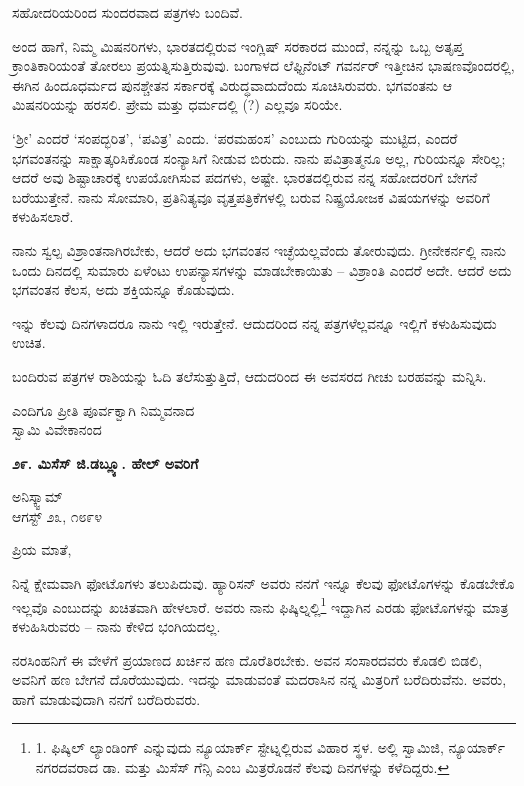 ಸಹೋದರಿಯರಿಂದ ಸುಂದರವಾದ ಪತ್ರಗಳು ಬಂದಿವೆ.

ಅಂದ ಹಾಗೆ, ನಿಮ್ಮ ಮಿಷನರಿಗಳು, ಭಾರತದಲ್ಲಿರುವ ಇಂಗ್ಲಿಷ್ ಸರಕಾರದ ಮುಂದೆ, ನನ್ನನ್ನು ಒಬ್ಬ ಅತೃಪ್ತ ಕ್ರಾಂತಿಕಾರಿಯಂತೆ ತೋರಲು ಪ್ರಯತ್ನಿಸುತ್ತಿರುವುವು. ಬಂಗಾಳದ ಲೆಫ್ಟಿನೆಂಟ್ ಗವರ್ನರ್ ಇತ್ತೀಚಿನ ಭಾಷಣವೊಂದರಲ್ಲಿ, ಈಗಿನ ಹಿಂದೂಧರ್ಮದ ಪುನಶ್ಚೇತನ ಸರ್ಕಾರಕ್ಕೆ ವಿರುದ್ಧವಾದುದೆಂದು ಸೂಚಿಸಿರುವರು. ಭಗವಂತನು ಆ ಮಿಷನರಿಯನ್ನು ಹರಸಲಿ. ಪ್ರೇಮ ಮತ್ತು ಧರ್ಮದಲ್ಲಿ (?) ಎಲ್ಲವೂ ಸರಿಯೇ.

‘ಶ‍್ರೀ’ ಎಂದರೆ ‘ಸಂಪದ್ಭರಿತ’, ‘ಪವಿತ್ರ’ ಎಂದು. ‘ಪರಮಹಂಸ’ ಎಂಬುದು ಗುರಿಯನ್ನು ಮುಟ್ಟಿದ, ಎಂದರೆ ಭಗವಂತನನ್ನು ಸಾಕ್ಷಾತ್ಕರಿಸಿಕೊಂಡ ಸಂನ್ಯಾಸಿಗೆ ನೀಡುವ ಬಿರುದು. ನಾನು ಪವಿತ್ರಾತ್ಮನೂ ಅಲ್ಲ, ಗುರಿಯನ್ನೂ ಸೇರಿಲ್ಲ; ಆದರೆ ಅವು ಶಿಷ್ಟಾಚಾರಕ್ಕೆ ಉಪಯೋಗಿಸುವ ಪದಗಳು, ಅಷ್ಟೇ. ಭಾರತದಲ್ಲಿರುವ ನನ್ನ ಸಹೋದರರಿಗೆ ಬೇಗನೆ ಬರೆಯುತ್ತೇನೆ. ನಾನು ಸೋಮಾರಿ, ಪ್ರತಿನಿತ್ಯವೂ ವೃತ್ತಪತ್ರಿಕೆಗಳಲ್ಲಿ ಬರುವ ನಿಷ್ಪ್ರಯೋಜಕ ವಿಷಯಗಳನ್ನು ಅವರಿಗೆ ಕಳುಹಿಸಲಾರೆ.

ನಾನು ಸ್ವಲ್ಪ ವಿಶ್ರಾಂತನಾಗಿರಬೇಕು, ಆದರೆ ಅದು ಭಗವಂತನ ಇಚ್ಛೆಯಲ್ಲವೆಂದು ತೋರುವುದು. ಗ್ರೀನೇಕರ್ನಲ್ಲಿ ನಾನು ಒಂದು ದಿನದಲ್ಲಿ ಸುಮಾರು ಏಳೆಂಟು ಉಪನ್ಯಾಸಗಳನ್ನು ಮಾಡಬೇಕಾಯಿತು – ವಿಶ್ರಾಂತಿ ಎಂದರೆ ಅದೇ. ಆದರೆ ಅದು ಭಗವಂತನ ಕೆಲಸ, ಅದು ಶಕ್ತಿಯನ್ನೂ ಕೊಡುವುದು.

ಇನ್ನು ಕೆಲವು ದಿನಗಳಾದರೂ ನಾನು ಇಲ್ಲಿ ಇರುತ್ತೇನೆ. ಆದುದರಿಂದ ನನ್ನ ಪತ್ರಗಳೆಲ್ಲವನ್ನೂ ಇಲ್ಲಿಗೆ ಕಳುಹಿಸುವುದು ಉಚಿತ.

ಬಂದಿರುವ ಪತ್ರಗಳ ರಾಶಿಯನ್ನು ಓದಿ ತಲೆಸುತ್ತುತ್ತಿದೆ, ಆದುದರಿಂದ ಈ ಅವಸರದ ಗೀಚು ಬರಹವನ್ನು ಮನ್ನಿಸಿ.

\begin{flushright}
ಎಂದಿಗೂ ಪ್ರೀತಿ ಪೂರ್ವಕ್ವಾಗಿ ನಿಮ್ಮವನಾದ\\ಸ್ವಾಮಿ ವಿವೇಕಾನಂದ
\end{flushright}

\begin{center}
\textbf{೨೯. ಮಿಸೆಸ್ ಜಿ.ಡಬ್ಲ್ಯೂ. ಹೇಲ್ ಅವರಿಗೆ}
\end{center}

\begin{flushright}
ಅನಿಸ್ಕ್ವಾಮ್​\\ಆಗಸ್ಟ್ ೨೩, ೧೮೯೪
\end{flushright}

ಪ್ರಿಯ ಮಾತೆ,

ನಿನ್ನೆ ಕ್ಷೇಮವಾಗಿ ಫೋಟೊಗಳು ತಲುಪಿದುವು. ಹ್ಯಾರಿಸನ್ ಅವರು ನನಗೆ ಇನ್ನೂ ಕೆಲವು ಫೋಟೊಗಳನ್ನು ಕೊಡಬೇಕೊ ಇಲ್ಲವೊ ಎಂಬುದನ್ನು ಖಚಿತವಾಗಿ ಹೇಳಲಾರೆ. ಅವರು ನಾನು ಫಿಷ್ಕಿಲ್ನಲ್ಲಿ\footnote{1. ಫಿಷ್ಕಿಲ್ ಲ್ಯಾಂಡಿಂಗ್ ಎನ್ನುವುದು ನ್ಯೂಯಾರ್ಕ್ ಸ್ಟೇಟ್ನಲ್ಲಿರುವ ವಿಹಾರ ಸ್ಥಳ. ಅಲ್ಲಿ ಸ್ವಾಮಿಜಿ, ನ್ಯೂಯಾರ್ಕ್ ನಗರದವರಾದ ಡಾ. ಮತ್ತು ಮಿಸೆಸ್ ಗೆನ್ಸಿ ಎಂಬ ಮಿತ್ರರೊಡನೆ ಕೆಲವು ದಿನಗಳನ್ನು ಕಳೆದಿದ್ದರು.} ಇದ್ದಾಗಿನ ಎರಡು ಫೋಟೊಗಳನ್ನು ಮಾತ್ರ ಕಳುಹಿಸಿರುವರು – ನಾನು ಕೇಳಿದ ಭಂಗಿಯದಲ್ಲ.

ನರಸಿಂಹನಿಗೆ ಈ ವೇಳೆಗೆ ಪ್ರಯಾಣದ ಖರ್ಚಿನ ಹಣ ದೊರೆತಿರಬೇಕು. ಅವನ ಸಂಸಾರದವರು ಕೊಡಲಿ ಬಿಡಲಿ, ಅವನಿಗೆ ಹಣ ಬೇಗನೆ ದೊರೆಯುವುದು. ಇದನ್ನು ಮಾಡುವಂತೆ ಮದರಾಸಿನ ನನ್ನ ಮಿತ್ರರಿಗೆ ಬರೆದಿರುವೆನು. ಅವರು, ಹಾಗೆ ಮಾಡುವುದಾಗಿ ನನಗೆ ಬರೆದಿರುವರು.

